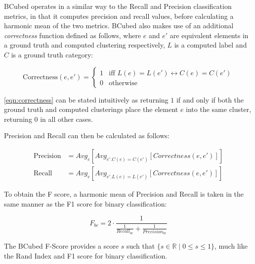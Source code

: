 \documentclass[../main.tex]{subfiles}
\begin{document}
	BCubed operates in a similar way to the Recall and Precision classification metrics, in that it computes precision and recall values, before calculating a harmonic mean of the two metrics. BCubed also makes use of an additional \emph{correctness} function defined as follows, where $e$ and $e'$ are equivalent elements in a ground truth and computed clustering respectively, $L$ is a computed label and $C$ is a ground truth category:
	
	\begin{equation}
	\label{eqn:correctness}
	    \text{Correctness}(e,e') = 
	    \begin{cases}
	        1 & \text{iff $L(e) = L(e') \leftrightarrow C(e) = C(e')$}\\
	        0 & \text{otherwise}
	    \end{cases}
	\end{equation}
	
	\autoref{eqn:correctness} can be stated intuitively as returning $1$ if and only if both the ground truth and computed clusterings place the element $e$ into the same cluster, returning $0$ in all other cases.
	
	Precision and Recall can then be calculated as follows:
	
    \begin{align}
    \label{eqn:bcubed-precision}
        \text{Precision} &= Avg_e [Avg_{e' . C(e) = C(e')}[Correctness(e,e')]]\\
        \label{eqn:bcubed-recall}
        \text{Recall} &= Avg_e [Avg_{e' . L(e) = L(e')}[Correctness(e,e')]]
    \end{align}

To obtain the F score, a harmonic mean of Precision and Recall is taken in the same manner as the F1 score for binary classification:

\begin{equation}
    F_{bc} = 2 \cdot \frac{1}{\frac{1}{Recall_{bc}} + \frac{1}{Precision_{bc}}}
\end{equation}

The BCubed F-Score provides a score $s$ such that $ \{s\in\mathbb{R} \mid 0\leq s \leq 1\} $, much like the Rand Index and F1 score for binary classification.
\end{document}
